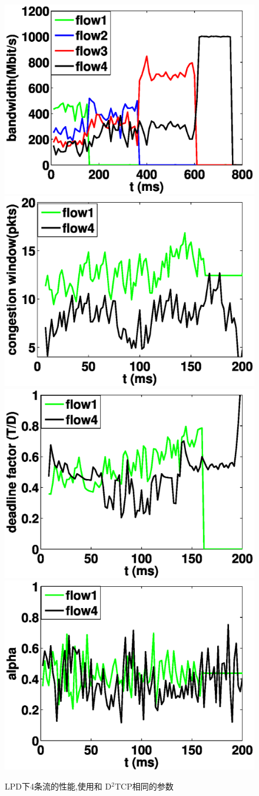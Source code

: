 %
\begin{figure}[h]
\setlength{\abovecaptionskip}{0pt} 
\setlength{\belowcaptionskip}{1pt} 
  \centering%
    {\includegraphics[width=0.45\columnwidth]{figures/LPD/evaluation_1/LPD_bandwidth2.eps}\quad}
      {\includegraphics[width=0.45\columnwidth]{figures/LPD/evaluation_1/LPD_window2.eps}\quad}
    {\includegraphics[width=0.45\columnwidth]{figures/LPD/evaluation_1/LPD_factor2.eps}\quad}
      {\includegraphics[width=0.45\columnwidth]{figures/LPD/evaluation_1/LPD_alpha2.eps}\quad}
  \caption{LPD下4条流的性能,使用和 D$^{2}$TCP相同的参数}
  \label{evalution_cases_principle_fig}
\end{figure}



